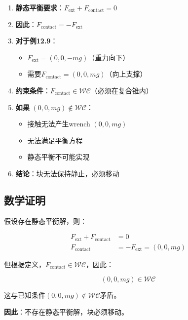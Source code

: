 \documentclass[12pt,a4paper]{article}
\begin{document}
\begin{enumerate}
    \item \textbf{静态平衡要求}：$F_{\text{ext}} + F_{\text{contact}} = 0$
    
    \item \textbf{因此}：$F_{\text{contact}} = -F_{\text{ext}}$
    
    \item \textbf{对于例12.9}：
    \begin{itemize}
        \item $F_{\text{ext}} = (0, 0, -mg)$（重力向下）
        \item 需要$F_{\text{contact}} = (0, 0, mg)$（向上支撑）
    \end{itemize}
    
    \item \textbf{约束条件}：$F_{\text{contact}} \in \mathcal{WC}$（必须在复合锥内）
    
    \item \textbf{如果} $(0, 0, mg) \notin \mathcal{WC}$：
    \begin{itemize}
        \item 接触无法产生wrench $(0, 0, mg)$
        \item 无法满足平衡方程
        \item 静态平衡不可能实现
    \end{itemize}
    
    \item \textbf{结论}：块无法保持静止，必须移动
\end{enumerate}

\subsection{数学证明}

假设存在静态平衡解，则：

\begin{align}
F_{\text{ext}} + F_{\text{contact}} &= 0 \\
F_{\text{contact}} &= -F_{\text{ext}} = (0, 0, mg)
\end{align}

但根据定义，$F_{\text{contact}} \in \mathcal{WC}$，因此：

\begin{equation}
(0, 0, mg) \in \mathcal{WC}
\end{equation}

这与已知条件$(0, 0, mg) \notin \mathcal{WC}$矛盾。

\textbf{因此}：不存在静态平衡解，块必须移动。
\end{document}
